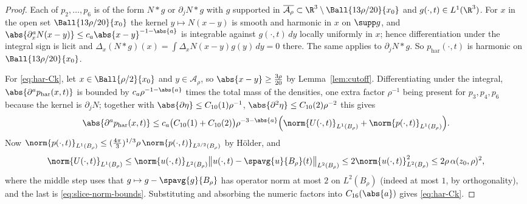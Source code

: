 \documentclass[11pt,reqno]{amsart}
\begin{document}
\begin{proof}
Each of $p_{2},\dots,p_{6}$ is of the form $N*g$ or $\partial_{j}N*g$ with $g$
supported in $\overline{\mathcal{A}_{\rho}}\subset\R^{3}\setminus\Ball{13\rho/20}{x_{0}}$
and $g(\cdot,t)\in L^{1}(\R^{3})$. For $x$ in the open set
$\Ball{13\rho/20}{x_{0}}$ the kernel $y\mapsto N(x-y)$ is smooth and harmonic in
$x$ on $\supp g$, and $\abs{\partial_{x}^{a}N(x-y)}\le c_{a}\abs{x-y}^{-1-\abs{a}}$
is integrable against $g(\cdot,t)\,dy$ locally uniformly in $x$; hence
differentiation under the integral sign is licit and
$\Delta_{x}(N*g)(x)=\int\Delta_{x}N(x-y)g(y)\,dy=0$ there. The same applies to
$\partial_{j}N*g$. So $p_{\mathrm{har}}(\cdot,t)$ is harmonic on
$\Ball{13\rho/20}{x_{0}}$.

For \eqref{eq:har-Ck}, let $x\in\Ball{\rho/2}{x_{0}}$ and
$y\in\mathcal{A}_{\rho}$, so $\abs{x-y}\ge\tfrac{3\rho}{20}$ by
Lemma~\ref{lem:cutoff}. Differentiating under the integral,
$\abs{\partial^{a}p_{\mathrm{har}}(x,t)}$ is bounded by
$c_{a}\rho^{-1-\abs{a}}$ times the total mass of the densities, one extra factor
$\rho^{-1}$ being present for $p_{3},p_{4},p_{6}$ because the kernel is
$\partial_{j}N$; together with
$\abs{\partial\eta}\le C_{10}(1)\rho^{-1}$,
$\abs{\partial^{2}\eta}\le C_{10}(2)\rho^{-2}$ this gives
\[
  \abs{\partial^{a}p_{\mathrm{har}}(x,t)}
  \le c_{a}\bigl(C_{10}(1)+C_{10}(2)\bigr)\rho^{-3-\abs{a}}
     \Bigl(\norm{U(\cdot,t)}_{L^{1}(B_{\rho})}+\norm{p(\cdot,t)}_{L^{1}(B_{\rho})}\Bigr).
\]
Now $\norm{p(\cdot,t)}_{L^{1}(B_{\rho})}\le(\tfrac{4\pi}{3})^{1/3}\rho\,
\norm{p(\cdot,t)}_{L^{3/2}(B_{\rho})}$ by H\"older, and
\[
  \norm{U(\cdot,t)}_{L^{1}(B_{\rho})}
  \le\norm{u(\cdot,t)}_{L^{2}(B_{\rho})}
     \bigl\|u(\cdot,t)-\spavg{u}{B_{\rho}}(t)\bigr\|_{L^{2}(B_{\rho})}
  \le2\norm{u(\cdot,t)}_{L^{2}(B_{\rho})}^{2}
  \le2\rho\,\alpha(z_{0},\rho)^{2},
\]
where the middle step uses that $g\mapsto g-\spavg{g}{B_{\rho}}$ has operator
norm at most $2$ on $L^{2}(B_{\rho})$ (indeed at most $1$, by orthogonality), and
the last is \eqref{eq:slice-norm-bounds}. Substituting and absorbing the numeric
factors into $C_{16}(\abs{a})$ gives \eqref{eq:har-Ck}.
\end{proof}
\end{document}
